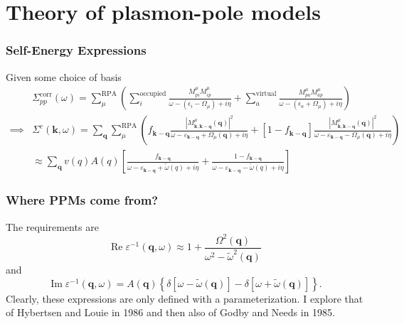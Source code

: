 \section{Theory of plasmon-pole models}
\begin{frame}
\frametitle{Self-Energy Expressions}
Given some choice of basis
\begin{align}
    &\Sigma_{pp}^{\text{corr}}(\omega) = \sum_{\mu }^{\text{RPA}}\left(\sum_{i}^{\text{occupied}} \frac{M_{pi}^{\mu }M_{ip}^{\mu }}{\omega -(\epsilon _{i}-\Omega  _{\mu })+i\eta}+ \sum_{a}^{\text{virtual}} \frac{M_{pa}^{\mu }M_{ap}^{\mu }}{\omega -(\epsilon _{a}+\Omega  _{\mu })+i\eta}\right) \\
\implies &\Sigma^c(\mathbf{k}, \omega)=\sum_{\mathbf{q}} \sum_\mu^{\mathrm{RPA}}\left(f_{\mathbf{k}-\mathbf{q}} \frac{\left|M_{\mathbf{k}, \mathbf{k}-\mathbf{q}}^\mu(\mathbf{q})\right|^2}{\omega-\varepsilon_{\mathbf{k}-\mathbf{q}}+\Omega_\mu(\mathbf{q})+i \eta}+\left[1-f_{\mathbf{k}-\mathbf{q}}\right] \frac{\left|M_{\mathbf{k}, \mathbf{k}-\mathbf{q}}^\mu(\mathbf{q})\right|^2}{\omega-\varepsilon_{\mathbf{k}-\mathbf{q}}-\Omega_\mu(\mathbf{q})+i \eta}\right)\\
&\approx \sum_{\mathbf{q}} v(q) A(q)\left[\frac{f_{\mathbf{k}-\mathbf{q}}}{\omega-\varepsilon_{\mathbf{k}-\mathbf{q}}+\tilde{\omega}(q)+i \eta}+\frac{1-f_{\mathbf{k}-\mathbf{q}}}{\omega-\varepsilon_{\mathbf{k}-\mathbf{q}}-\tilde{\omega}(q)+i \eta}\right]
\end{align}
\end{frame}
\begin{frame}
\frametitle{Where PPMs come from?}
The requirements are
\begin{equation}
\operatorname{Re} \varepsilon^{-1}(\mathbf{q}, \omega) \approx 1+\frac{\Omega^2(\mathbf{q})}{\omega^2-\tilde{\omega}^2(\mathbf{q})}
\end{equation}
and
\begin{equation}
    \operatorname{Im} \varepsilon^{-1}(\mathbf{q},\omega ) =A(\mathbf{q})\left\{\delta\left[\omega-\widetilde{\omega}(\mathbf{q})\right]-\delta\left[\omega+\widetilde{\omega}(\mathbf{q})\right]\right\}.
\end{equation}
\pause
Clearly, these expressions are only defined with a parameterization. I explore that of Hybertsen and Louie in 1986 and then also of Godby and Needs in 1985. 
\end{frame}

